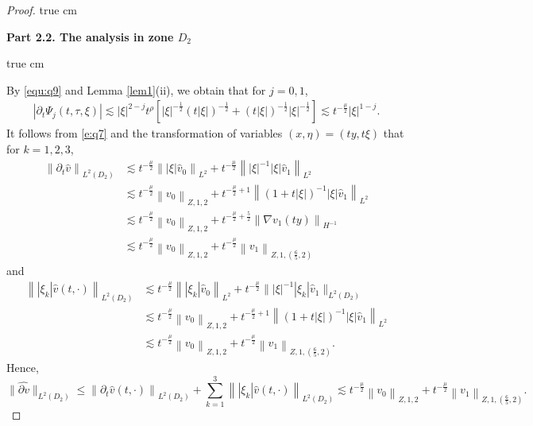 \documentclass[10pt,a4paper]{amsart}
\newcommand{\f}{\frac}
\newcommand{\p}{\partial}
\begin{document}
\begin{proof}
 true cm

{\bf Part 2.2.  The analysis  in zone $D_2$}

 true cm

By  \eqref{equ:q9} and Lemma \ref{lem1}(ii), we obtain that for $j=0,1$,
\begin{equation}\label{e:q17}
\begin{aligned}
|\p_t\Psi_j(t,\tau,\xi)|
\lesssim |\xi|^{2-j} t^{\rho}\left[|\xi|^{-\f12}(t|\xi|)^{-\f12}+(t|\xi|)^{-\f12}|\xi|^{-\f12}\right]\lesssim t^{-\f{\mu}{2}}|\xi|^{1-j}.
\end{aligned}
\end{equation}
It follows from \eqref{e:q7} and the transformation of variables $(x, \eta)=(ty, t\xi)$  that for $k=1, 2, 3$,
\begin{equation}\label{e:q18}
\begin{aligned}
\left\|\p_t\hat{v}\right\|_{L^2(D_2)} & \lesssim  t^{-\f{\mu}{2}}\left\||\xi|\hat{v}_{0}\right\|_{L^{2}}+t^{-\f{\mu}{2}}\left\||\xi|^{-1}|\xi|\hat{v}_{1}\right\|_{L^{2}} \\
& \lesssim  t^{-\f{\mu}{2}}\left\|v_{0}\right\|_{Z, 1, 2}+t^{-\f{\mu}{2}+1}\left\|(1+t|\xi|)^{-1}|\xi|\hat{v}_{1}\right\|_{L^{2}} \\
& \lesssim  t^{-\f{\mu}{2}}\left\|v_{0}\right\|_{Z, 1, 2}+t^{-\f{\mu}{2}+\f52}\left\|\nabla v_{1}(ty)\right\|_{H^{-1}} \\
& \lesssim  t^{-\f{\mu}{2}}\left\|v_{0}\right\|_{Z, 1, 2}+t^{-\f{\mu}{2}}\left\| v_{1}\right\|_{Z, 1, (\f65, 2)}
\end{aligned}
\end{equation}
and
\begin{equation}\label{e:q19}
\begin{aligned}
\left\||\xi_k|\hat{v}(t, \cdot)\right\|_{L^2(D_2)}&\lesssim t^{-\frac{\mu}{2}}\left\||\xi_k|\hat{v}_{0}\right\|_{L^{2}}+t^{-\f{\mu}{2}} \||\xi|^{-1}|\xi_k|\hat{v}_{1}\|_{L^{2}(D_2)}\\
& \lesssim  t^{-\f{\mu}{2}}\left\|v_{0}\right\|_{Z, 1, 2}+t^{-\f{\mu}{2}+1}\left\|(1+t|\xi|)^{-1}|\xi|\hat{v}_{1}\right\|_{L^{2}} \\
& \lesssim  t^{-\f{\mu}{2}}\left\|v_{0}\right\|_{Z, 1, 2}+t^{-\f{\mu}{2}}\left\| v_{1}\right\|_{Z, 1, (\f65, 2)}.
\end{aligned}
\end{equation}
Hence,
\begin{equation}\label{e:q20}
\|\widehat{\p v}\|_{L^2(D_2)} \leq \left\|\p_t\hat{v}(t, \cdot)\right\|_{L^2(D_2)}+\sum_{k=1}^{3}\left\||\xi_k|\hat{v}(t, \cdot)\right\|_{L^2(D_2)}\lesssim  t^{-\f{\mu}{2}}\left\|v_{0}\right\|_{Z, 1, 2}+t^{-\f{\mu}{2}}\left\| v_{1}\right\|_{Z, 1, (\f65, 2)}.
\end{equation}


\end{proof}
\end{document}

